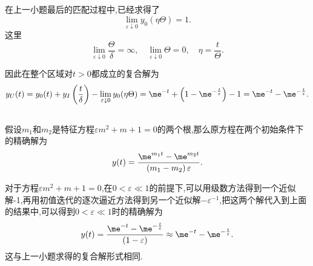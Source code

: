 \documentclass[12pt]{article}
\begin{document}
\subsection{}
在上一小题最后的匹配过程中,已经求得了
$$
\lim _{\varepsilon \downarrow 0} y_{0}(\eta \Theta)=1.
$$
这里
$$
\lim _{\varepsilon \downarrow 0} \frac{\Theta}{\delta}=\infty, \quad \lim _{\varepsilon \downarrow 0} \Theta=0, \quad \eta=\frac{t}{\Theta}.
$$

因此在整个区域对$t>0$都成立的复合解为
$$
y_{U}(t)=y_{0}(t)+y_{I}\left(\frac{t}{\delta}\right)-\lim _{\varepsilon \downarrow 0} y_{0}(\eta \Theta)=\me^{-t}+\left(1-\me^{-\frac{t}{\varepsilon}}\right)-1=\me^{-t}-\me^{-\frac{t}{\varepsilon}}.
$$

\subsection{}
假设$m_{1}$和$m_{2}$是特征方程$\varepsilon m^{2}+m+1=0$的两个根,那么原方程在两个初始条件下的精确解为
$$
y(t)=\frac{\me^{m_{1} t}-\me^{m_{2} t}}{\left(m_{1}-m_{2}\right) \varepsilon}.
$$

对于方程$\varepsilon m^{2}+m+1=0$,在$0<\varepsilon \ll 1$的前提下,可以用级数方法得到一个近似解-1,再用初值迭代的逐次逼近方法得到另一个近似解$-\varepsilon^{-1}$,把这两个解代入到上面的结果中,可以得到$0<\varepsilon \ll 1$时的精确解为
$$
y(t)=\frac{\me^{-t}-\me^{-\frac{t}{\varepsilon}}}{(1-\varepsilon)} \approx \me^{-t}-\me^{-\frac{t}{\varepsilon}}.
$$
这与上一小题求得的复合解形式相同.



\nocite{*}


\end{document}
